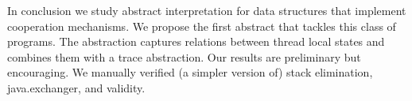 In conclusion we study abstract interpretation for data structures that implement cooperation mechanisms. 
We propose the first abstract that tackles this class of programs. 
The abstraction captures relations between thread local states and combines them with a trace abstraction. 
 Our results are preliminary but encouraging.
We manually verified (a simpler version of) stack elimination, java.exchanger, and validity. 